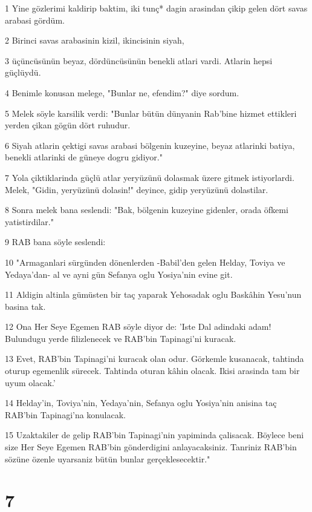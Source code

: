 \par 1 Yine gözlerimi kaldirip baktim, iki tunç* dagin arasindan çikip gelen dört savas arabasi gördüm.
\par 2 Birinci savas arabasinin kizil, ikincisinin siyah,
\par 3 üçüncüsünün beyaz, dördüncüsünün benekli atlari vardi. Atlarin hepsi güçlüydü.
\par 4 Benimle konusan melege, "Bunlar ne, efendim?" diye sordum.
\par 5 Melek söyle karsilik verdi: "Bunlar bütün dünyanin Rab'bine hizmet ettikleri yerden çikan gögün dört ruhudur.
\par 6 Siyah atlarin çektigi savas arabasi bölgenin kuzeyine, beyaz atlarinki batiya, benekli atlarinki de güneye dogru gidiyor."
\par 7 Yola çiktiklarinda güçlü atlar yeryüzünü dolasmak üzere gitmek istiyorlardi. Melek, "Gidin, yeryüzünü dolasin!" deyince, gidip yeryüzünü dolastilar.
\par 8 Sonra melek bana seslendi: "Bak, bölgenin kuzeyine gidenler, orada öfkemi yatistirdilar."
\par 9 RAB bana söyle seslendi:
\par 10 "Armaganlari sürgünden dönenlerden -Babil'den gelen Helday, Toviya ve Yedaya'dan- al ve ayni gün Sefanya oglu Yosiya'nin evine git.
\par 11 Aldigin altinla gümüsten bir taç yaparak Yehosadak oglu Baskâhin Yesu'nun basina tak.
\par 12 Ona Her Seye Egemen RAB söyle diyor de: 'Iste Dal adindaki adam! Bulundugu yerde filizlenecek ve RAB'bin Tapinagi'ni kuracak.
\par 13 Evet, RAB'bin Tapinagi'ni kuracak olan odur. Görkemle kusanacak, tahtinda oturup egemenlik sürecek. Tahtinda oturan kâhin olacak. Ikisi arasinda tam bir uyum olacak.'
\par 14 Helday'in, Toviya'nin, Yedaya'nin, Sefanya oglu Yosiya'nin anisina taç RAB'bin Tapinagi'na konulacak.
\par 15 Uzaktakiler de gelip RAB'bin Tapinagi'nin yapiminda çalisacak. Böylece beni size Her Seye Egemen RAB'bin gönderdigini anlayacaksiniz. Tanriniz RAB'bin sözüne özenle uyarsaniz bütün bunlar gerçeklesecektir."

\chapter{7}

